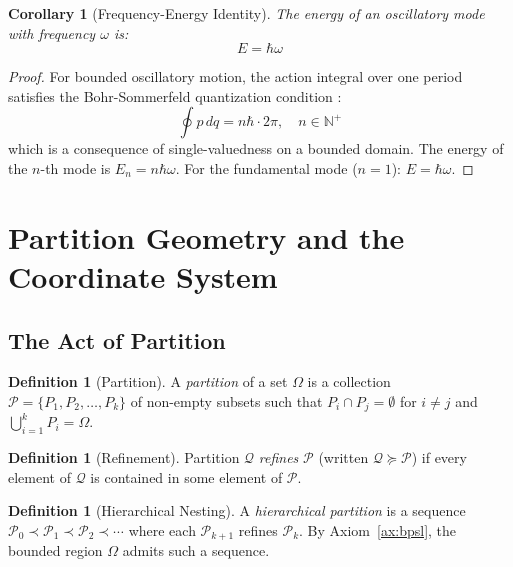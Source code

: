 \documentclass[11pt,a4paper]{article}
\newtheorem{corollary}[theorem]{Corollary}
\theoremstyle{definition}
\newtheorem{definition}[theorem]{Definition}
\theoremstyle{remark}
\newcommand{\Natural}{\mathbb{N}}
\begin{document}
\begin{corollary}[Frequency-Energy Identity]
\label{cor:freq_energy}
The energy of an oscillatory mode with frequency $\omega$ is:
\begin{equation}
E = \hbar \omega
\label{eq:freq_energy}
\end{equation}
\end{corollary}

\begin{proof}
For bounded oscillatory motion, the action integral over one period satisfies the Bohr-Sommerfeld quantization condition \citep{bohr1913, landau1976}:
\begin{equation}
\oint p \, dq = n \hbar \cdot 2\pi, \quad n \in \Natural^+
\end{equation}
which is a consequence of single-valuedness on a bounded domain. The energy of the $n$-th mode is $E_n = n\hbar\omega$. For the fundamental mode ($n=1$): $E = \hbar\omega$.
\end{proof}

\section{Partition Geometry and the Coordinate System}
\label{sec:partition_geometry}

\subsection{The Act of Partition}

\begin{definition}[Partition]
\label{def:partition}
A \emph{partition} of a set $\Omega$ is a collection $\mathcal{P} = \{P_1, P_2, \ldots, P_k\}$ of non-empty subsets such that $P_i \cap P_j = \emptyset$ for $i \neq j$ and $\bigcup_{i=1}^{k} P_i = \Omega$.
\end{definition}

\begin{definition}[Refinement]
\label{def:refinement}
Partition $\mathcal{Q}$ \emph{refines} $\mathcal{P}$ (written $\mathcal{Q} \succeq \mathcal{P}$) if every element of $\mathcal{Q}$ is contained in some element of $\mathcal{P}$.
\end{definition}

\begin{definition}[Hierarchical Nesting]
\label{def:nesting}
A \emph{hierarchical partition} is a sequence $\mathcal{P}_0 \prec \mathcal{P}_1 \prec \mathcal{P}_2 \prec \cdots$ where each $\mathcal{P}_{k+1}$ refines $\mathcal{P}_k$. By Axiom~\ref{ax:bpsl}, the bounded region $\Omega$ admits such a sequence.
\end{definition}
\end{document}
